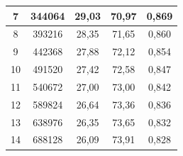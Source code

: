 \begin{table}[]
{\begin{tabular}{ccccc}
			7                 & 344064                                                                 & 29,03                                                                        & 70,97                                                                             & 0,869                   \\ \hline
			8                 & 393216                                                                 & 28,35                                                                        & 71,65                                                                             & 0,860                   \\ \hline
			9                 & 442368                                                                 & 27,88                                                                        & 72,12                                                                             & 0,854                   \\ \hline
			10                & 491520                                                                 & 27,42                                                                        & 72,58                                                                             & 0,847                   \\ \hline
			11                & 540672                                                                 & 27,00                                                                        & 73,00                                                                             & 0,842                   \\ \hline
			12                & 589824                                                                 & 26,64                                                                        & 73,36                                                                             & 0,836                   \\ \hline
			13                & 638976                                                                 & 26,35                                                                        & 73,65                                                                             & 0,832                   \\ \hline
			14                & 688128                                                                 & 26,09                                                                        & 73,91                                                                             & 0,828                   \\ \hline

\end{tabular}}
\end{table}
